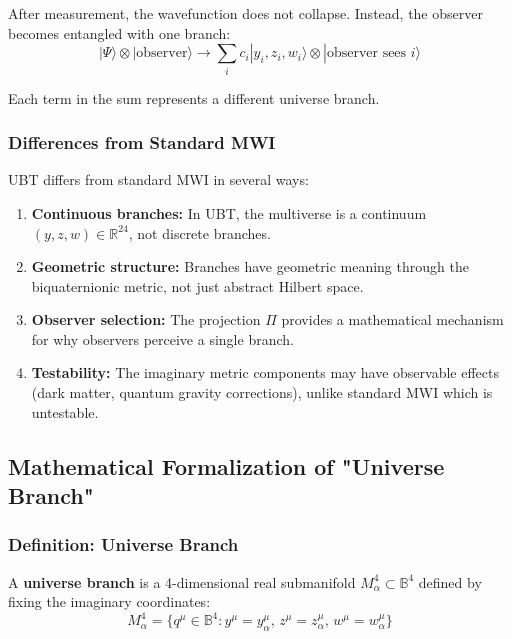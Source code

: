 After measurement, the wavefunction does not collapse. Instead, the observer becomes entangled with one branch:
\begin{equation}
|\Psi\rangle \otimes |\text{observer}\rangle \to \sum_i c_i |y_i, z_i, w_i\rangle \otimes |\text{observer sees } i\rangle
\end{equation}

Each term in the sum represents a different universe branch.

\subsubsection{Differences from Standard MWI}

UBT differs from standard MWI in several ways:

\begin{enumerate}
\item \textbf{Continuous branches:} In UBT, the multiverse is a continuum $(y, z, w) \in \mathbb{R}^{24}$, not discrete branches.

\item \textbf{Geometric structure:} Branches have geometric meaning through the biquaternionic metric, not just abstract Hilbert space.

\item \textbf{Observer selection:} The projection $\Pi$ provides a mathematical mechanism for why observers perceive a single branch.

\item \textbf{Testability:} The imaginary metric components may have observable effects (dark matter, quantum gravity corrections), unlike standard MWI which is untestable.
\end{enumerate}

\subsection{Mathematical Formalization of "Universe Branch"}

\subsubsection{Definition: Universe Branch}

A \textbf{universe branch} is a 4-dimensional real submanifold $M^4_{\alpha} \subset \mathbb{B}^4$ defined by fixing the imaginary coordinates:
\begin{equation}
M^4_{\alpha} = \{q^{\mu} \in \mathbb{B}^4 : y^{\mu} = y^{\mu}_{\alpha}, \, z^{\mu} = z^{\mu}_{\alpha}, \, w^{\mu} = w^{\mu}_{\alpha}\}
\end{equation}

